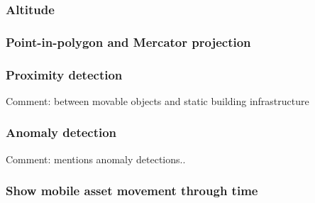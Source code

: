 \documentclass{article}
\begin{document}
\subsubsection{Altitude}
\subsubsection{Point-in-polygon and Mercator projection}
\subsubsection{Proximity detection}
Comment: between movable objects and static building infrastructure
\subsubsection{Anomaly detection}
Comment: \cite{li_digital_2022} mentions anomaly detections..
\subsubsection{Show mobile asset movement through time}




\newpage
\printbibliography
\end{document}
